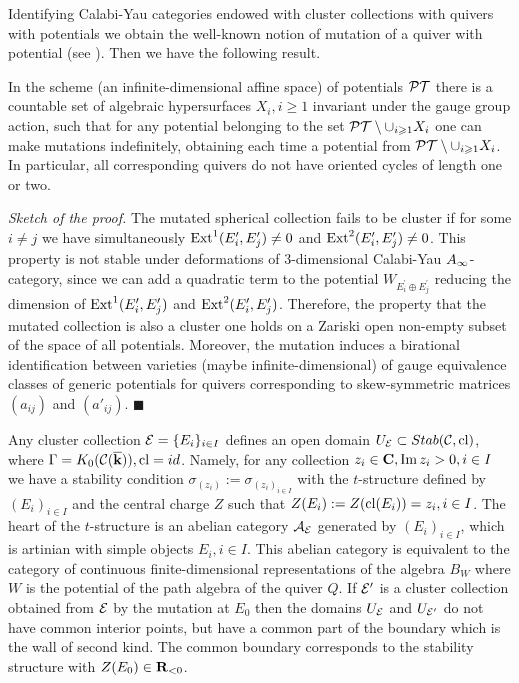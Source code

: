 \documentclass[12pt]{article}
\begin{document}
Identifying Calabi-Yau categories endowed with cluster collections with quivers with potentials  we obtain the well-known notion of mutation of a quiver with potential (see \cite{Ze}). Then we have the following result.

\begin{thm} In the scheme (an infinite-dimensional affine space) of potentials ${\cal PT}$ there is a countable set of algebraic hypersurfaces
$X_i, i\geqslant 1$ invariant under the gauge group action, such that
for any potential belonging to the  set  ${\cal PT}\setminus \cup_{i\geqslant 1}X_i$ one can make mutations indefinitely, obtaining each time a potential
from ${\cal PT}\setminus \cup_{i\geqslant 1}X_i$. In particular, all corresponding quivers do not have oriented cycles of length one or two.


\end{thm}


{\it Sketch of the proof.} The mutated spherical collection fails to be cluster if for some $i\ne j$ we have simultaneously $\operatorname{Ext}^1(E_i^{\prime},E_j^{\prime})\ne 0$ and $\operatorname{Ext}^2(E_i^{\prime},E_j^{\prime})\ne 0$.
This property is not stable under deformations of 3-dimensional Calabi-Yau $A_{\infty}$-category, since we can add a quadratic term to the potential
$W_{E_i^{\prime}\oplus E_j^{\prime}}$ reducing the dimension of $\operatorname{Ext}^1(E_i^{\prime},E_j^{\prime})$ and $\operatorname{Ext}^2(E_i^{\prime},E_j^{\prime})$. Therefore, the property that the mutated collection is also a cluster one holds on a Zariski open non-empty subset of the space of all potentials. Moreover,
the mutation induces a birational identification between varieties (maybe infinite-dimensional) of gauge equivalence classes of generic potentials
 for quivers corresponding to skew-symmetric matrices $(a_{ij})$ and $(a'_{ij})$. $\blacksquare$



Any cluster collection ${\cal E}=\{E_i\}_{i\in I}$ defines an open domain $U_{{\cal E}}\subset Stab({\mathcal C},\operatorname{cl})$, where $\Gamma=K_0({\mathcal C}({\overline{\bf k}})), \operatorname{cl}=id$. Namely, for any collection
$z_i\in {\bf C}, \operatorname{Im}z_i>0, i\in I$ we have a stability condition $\sigma_{(z_i)}:=\sigma_{(z_i)_{i\in I}}$ with the $t$-structure defined by $(E_i)_{i\in I}$ and the central charge $Z$ such that $Z(E_i):=Z(\operatorname{cl}(E_i))=z_i, i\in I$. The heart of the $t$-structure is an abelian category ${\cal A}_{\cal E}$ generated by $(E_i)_{i\in I}$, which is artinian with simple objects $E_i, i\in I$.  This abelian category is equivalent to the category of continuous finite-dimensional representations of the algebra $B_W$ where $W$ is the potential of the path algebra of the quiver $Q$.
If ${\cal E}^{\prime}$ is a cluster collection obtained from ${\cal E}$ by the mutation at $E_0$ then the domains
$U_{{\cal E}}$ and $U_{{\cal E}^{\prime}}$ do not have common interior points, but have a common part of the boundary which is the wall of second kind. The common boundary corresponds to the stability structure with $Z(E_0)\in {\bf R}_{<0}$.
\end{document}
